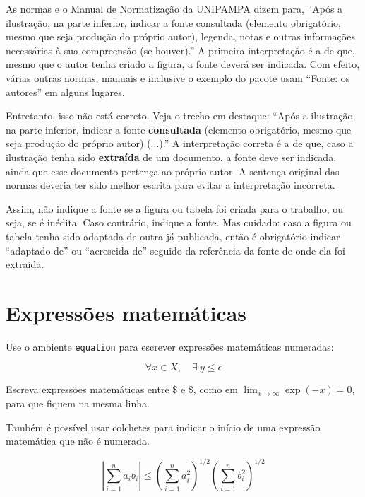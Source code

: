 As normas  e o Manual de Normatização da UNIPAMPA \cite{SisbiUnipampa2011} dizem para, ``Após a ilustração, na parte inferior, indicar a fonte consultada (elemento obrigatório, mesmo que seja produção do próprio autor), legenda, notas e outras informações necessárias à sua compreensão (se houver).''
  A primeira interpretação é a de que, mesmo que o autor tenha criado a figura, a fonte deverá ser indicada.
  Com efeito, várias outras normas, manuais e inclusive o exemplo do pacote  usam ``Fonte: os autores'' em alguns lugares.
  
Entretanto, isso não está correto.
  Veja o trecho em destaque: ``Após a ilustração, na parte inferior, indicar a fonte \textbf{consultada} (elemento obrigatório, mesmo que seja produção do próprio autor) (...).''
  A interpretação correta é a de que, caso a ilustração tenha sido \textbf{extraída} de um documento, a fonte deve ser indicada, ainda que esse documento pertença ao próprio autor.
  A sentença original das normas deveria ter sido melhor escrita para evitar a interpretação incorreta.

Assim, não indique a fonte se a figura ou tabela foi criada para o trabalho, ou seja, se é inédita.
  Caso contrário, indique a fonte.
  Mas cuidado: caso a figura ou tabela tenha sido adaptada de outra já publicada, então é obrigatório indicar ``adaptado de'' ou ``acrescida de'' seguido da referência da fonte de onde ela foi extraída.


\section{Expressões matemáticas}

Use o ambiente \texttt{equation} para escrever expressões matemáticas numeradas:

\begin{equation}
  \forall x \in X, \quad \exists \: y \leq \epsilon
\end{equation}

Escreva expressões matemáticas entre \$ e \$, como em $\lim_{x \to \infty} \exp(-x) = 0$, para que fiquem na mesma linha.

Também é possível usar colchetes para indicar o início de uma expressão matemática que não é numerada.

\[
\left|\sum_{i=1}^n a_ib_i\right|
\le
\left(\sum_{i=1}^n a_i^2\right)^{1/2}
\left(\sum_{i=1}^n b_i^2\right)^{1/2}
\]

